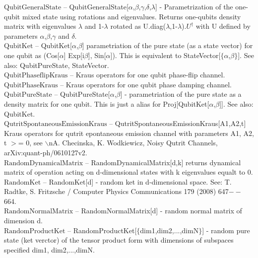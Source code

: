 \documentclass[a4paper,11pt]{article}
\begin{document}
\textbf{$ \text{QubitGeneralState} $ }-- QubitGeneralState[$\alpha $,$\beta $,$\gamma $,$\delta $,$\lambda $] - Parametrization of the one-qubit mixed state using rotations and eigenvalues. Returns one-qubits density matrix with eigenvalues $\lambda $ and 1-$\lambda $ rotated as U.diag($\lambda $,1-$\lambda $).$ U^{\dagger } $ with U defined by parameters $\alpha $,$\beta $,$\gamma $ and $\delta $.$  $\\

\textbf{$ \text{QubitKet} $ }-- QubitKet[$\alpha $,$\beta $] parametriation of the pure state (as a state vector) for one qubit as (Cos[$\alpha $] Exp[i$\beta $], Sin[$\alpha $]). This is equivalent to StateVector[$\{\alpha $,$\beta \}$]. See also: QubitPureState, StateVector.$  $\\

\textbf{$ \text{QubitPhaseflipKraus} $ }-- Kraus operators for one qubit phase-flip channel.$  $\\

\textbf{$ \text{QubitPhaseKraus} $ }-- Kraus operators for one qubit phase damping channel.$  $\\

\textbf{$ \text{QubitPureState} $ }-- QubitPureState[$\alpha $,$\beta $] - parametriation of the pure state as a density matrix for one qubit. This is just a alias for Proj[QubitKet[$\alpha $,$\beta $]]. See also: QubitKet.$  $\\

\textbf{$ \text{QutritSpontaneousEmissionKraus} $ }-- QutritSpontaneousEmissionKraus[A1,A2,t] Kraus operators for qutrit epontaneous emission channel with parameters A1, A2, t $>$= 0, see $\backslash $nA. Checinska, K. Wodkiewicz, Noisy Qutrit Channels, arXiv:quant-ph/0610127v2.$  $\\

\textbf{$ \text{RandomDynamicalMatrix} $ }-- RandomDynamicalMatrix[d,k] returns dynamical matrix of operation acting on d-dimensional states with k eigenvalues equalt to 0.$  $\\

\textbf{$ \text{RandomKet} $ }-- RandomKet[d] - random ket in d-dimensional space. See: T. Radtke, S. Fritzsche / Computer Physics Communications 179 (2008) 647$--$664.$  $\\

\textbf{$ \text{RandomNormalMatrix} $ }-- RandomNormalMatrix[d] - random normal matrix of dimension d.$  $\\

\textbf{$ \text{RandomProductKet} $ }-- RandomProductKet[$\{$dim1,dim2,...,dimN$\}$] - random pure state (ket verctor) of the tensor product form with dimensions of subspaces specified dim1, dim2,...,dimN.$  $\\
\end{document}
